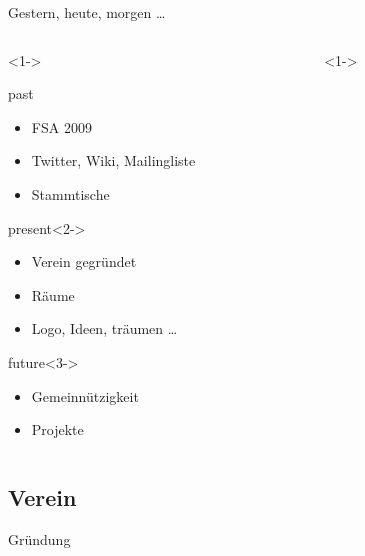 \documentclass{beamer}
\begin{document}
\begin{frame}[label=secddr]{Gestern, heute, morgen \dots}
    \begin{columns}
        \begin{column}{0.5\textwidth}<1->
            \begin{block}{past}
                \begin{itemize}
                    \item FSA 2009
                    \item Twitter, Wiki, Mailingliste
                    \item Stammtische
                \end{itemize}
            \end{block}
            \begin{block}{present}<2->
                \begin{itemize}
                    \item Verein gegründet
                    \item Räume
                    \item Logo, Ideen, träumen \dots
                \end{itemize}
            \end{block}
            \begin{block}{future}<3->
                \begin{itemize}
                    \item Gemeinnützigkeit
                    \item Projekte
                \end{itemize}
            \end{block}
        \end{column}
        \begin{column}{0.5\textwidth}<1->
            \begin{figure}
            \end{figure}
        \end{column}
    \end{columns}
\end{frame}

\subsection{Verein}

\begin{frame}[label=secgruendung]{Gründung}
    \begin{figure}
    \end{figure}
\end{frame}
\end{document}

